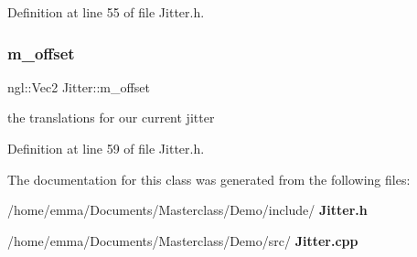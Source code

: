 Definition at line 55 of file Jitter.\+h.

\mbox{\label{class_jitter_ad44c515b5713cda0df2404434eea6824}} 
\subsubsection{m\_offset}
{\footnotesize\ttfamily ngl\+::\+Vec2 Jitter\+::m\+\_\+offset\hspace{0.3cm}{\ttfamily [private]}}



the translations for our current jitter 



Definition at line 59 of file Jitter.\+h.



The documentation for this class was generated from the following files\+:\begin{DoxyCompactItemize}
\item 
/home/emma/\+Documents/\+Masterclass/\+Demo/include/\textbf{ Jitter.\+h}\item 
/home/emma/\+Documents/\+Masterclass/\+Demo/src/\textbf{ Jitter.\+cpp}\end{DoxyCompactItemize}
